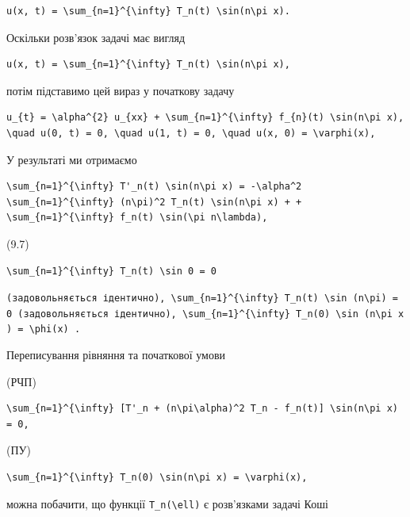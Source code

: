 \documentclass[
  ukrainian,
]{article}
\begin{document}
\begin{verbatim}
u(x, t) = \sum_{n=1}^{\infty} T_n(t) \sin(n\pi x).
\end{verbatim}

Оскільки розв'язок задачі має вигляд

\begin{verbatim}
u(x, t) = \sum_{n=1}^{\infty} T_n(t) \sin(n\pi x),
\end{verbatim}

потім підставимо цей вираз у початкову задачу

\begin{verbatim}
u_{t} = \alpha^{2} u_{xx} + \sum_{n=1}^{\infty} f_{n}(t) \sin(n\pi x),
\quad u(0, t) = 0, \quad u(1, t) = 0, \quad u(x, 0) = \varphi(x),
\end{verbatim}

У результаті ми отримаємо

\begin{verbatim}
\sum_{n=1}^{\infty} T'_n(t) \sin(n\pi x) = -\alpha^2 \sum_{n=1}^{\infty} (n\pi)^2 T_n(t) \sin(n\pi x) + + \sum_{n=1}^{\infty} f_n(t) \sin(\pi n\lambda),
\end{verbatim}

(9.7)

\begin{verbatim}
\sum_{n=1}^{\infty} T_n(t) \sin 0 = 0
\end{verbatim}

\texttt{(задовольняється\ ідентично),\ \textquotesingle{}\textbackslash{}sum\_\{n=1\}\^{}\{\textbackslash{}infty\}\ T\_n(t)\ \textbackslash{}sin\ (n\textbackslash{}pi)\ =\ 0\textquotesingle{}\ (задовольняється\ ідентично),\ \textquotesingle{}\textbackslash{}sum\_\{n=1\}\^{}\{\textbackslash{}infty\}\ T\_n(0)\ \textbackslash{}sin\ (n\textbackslash{}pi\ x)\ =\ \textbackslash{}phi(x)\textquotesingle{}\ .}

Переписування рівняння та початкової умови

(РЧП)

\begin{verbatim}
\sum_{n=1}^{\infty} [T'_n + (n\pi\alpha)^2 T_n - f_n(t)] \sin(n\pi x) = 0,
\end{verbatim}

(ПУ)

\begin{verbatim}
\sum_{n=1}^{\infty} T_n(0) \sin(n\pi x) = \varphi(x),
\end{verbatim}

можна побачити, що функції \texttt{T\_n(\textbackslash{}ell)} є
розв'язками задачі Коші
\end{document}
